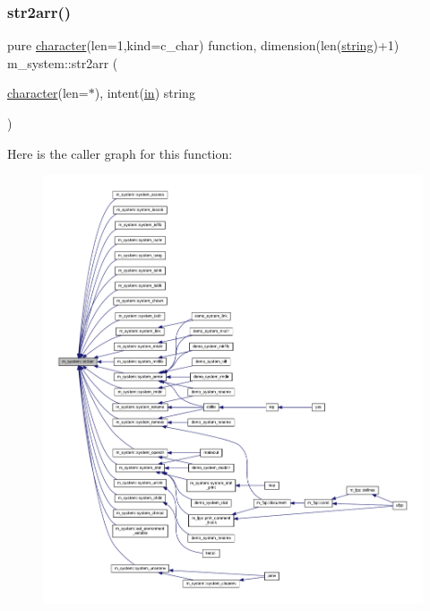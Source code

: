 \subsubsection{\texorpdfstring{str2arr()}{str2arr()}}
{\footnotesize\ttfamily pure \hyperlink{option__stopwatch_83_8txt_abd4b21fbbd175834027b5224bfe97e66}{character}(len=1,kind=c\+\_\+char) function, dimension(len(\hyperlink{what__overview_81_8txt_a74cb7e955273b9f9157b4f0c18a38849}{string})+1) m\+\_\+system\+::str2arr (\begin{DoxyParamCaption}\item[{\hyperlink{option__stopwatch_83_8txt_abd4b21fbbd175834027b5224bfe97e66}{character}(len=$\ast$), intent(\hyperlink{M__journal_83_8txt_afce72651d1eed785a2132bee863b2f38}{in})}]{string }\end{DoxyParamCaption})\hspace{0.3cm}{\ttfamily [private]}}

Here is the caller graph for this function\+:
\nopagebreak
\begin{figure}[H]
\begin{center}
\leavevmode
\includegraphics[width=350pt]{namespacem__system_af7e778ffc24aa7bc00b842a8e673aeaa_icgraph}
\end{center}
\end{figure}
\mbox{\label{namespacem__system_a4687a363acbb7084a51bc77844789275}} 

